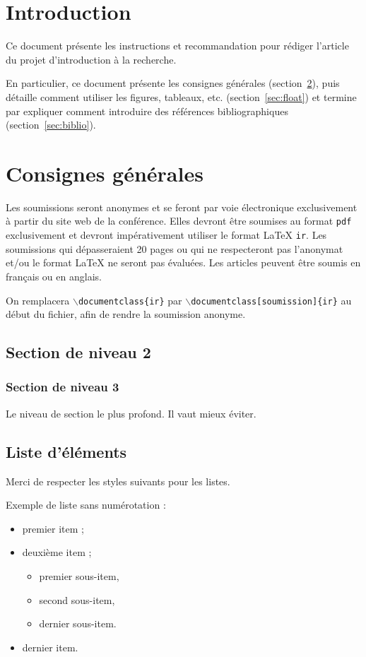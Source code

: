 \documentclass{ir}
\affiliation{
    \affil{1}Université de Lorraine\\
    UFR MIM -- LORIA\\
    3 Rue Augustin Fresnel, 57070 Metz\\
    alexandre.blansche@univ-lorraine.fr\\
    \affil{2}Université de Lorraine\\
    UFR MIM -- LGIPM\\
    3 Rue Augustin Fresnel, 57070 Metz\\
    dominique.michel@univ-lorraine.fr
}
\begin{document}
\section{Introduction}

Ce document présente les instructions et recommandation pour rédiger l'article du projet d'introduction à la recherche.

En particulier, ce document présente les consignes générales (section~\ref{sec:consignes}), puis détaille comment utiliser les figures, tableaux, etc. (section~\ref{sec:float}) et termine par expliquer comment introduire des références bibliographiques (section~\ref{sec:biblio}). 

\section{Consignes générales}\label{sec:consignes}

Les soumissions seront anonymes et se feront par voie électronique exclusivement à partir du site web de la conférence. Elles devront être soumises au format \texttt{pdf} exclusivement et devront impérativement utiliser le format \LaTeX{} \texttt{ir}. Les soumissions qui dépasseraient 20 pages ou qui ne respecteront pas l’anonymat et/ou le format \LaTeX{} ne seront pas évaluées. Les articles peuvent être soumis en français ou en anglais.

On remplacera \texttt{$\backslash$documentclass\{ir\}} par \texttt{$\backslash$documentclass[soumission]\{ir\}} au début du fichier, afin de rendre la soumission anonyme.

\subsection{Section de niveau 2}

\subsubsection{Section de niveau 3}

Le niveau de section le plus profond. Il vaut mieux éviter.

\subsection{Liste d'éléments}

Merci de respecter les styles suivants pour les listes.

Exemple de liste sans numérotation :
\begin{itemize}
    \item premier item ;
    \item deuxième item ;
    \begin{itemize}
      \item premier sous-item,
      \item second sous-item,
      \item dernier sous-item.
  \end{itemize}
  \item dernier item.
\end{itemize}
\end{document}
